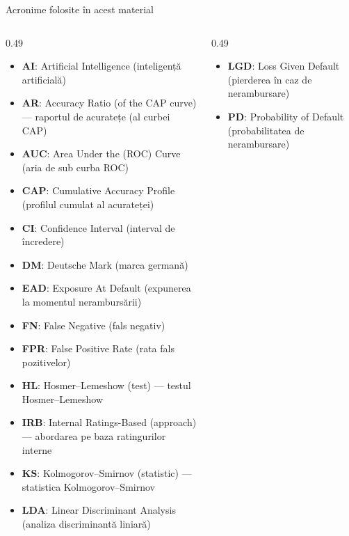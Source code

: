 {
\begin{frame}[noframenumbering]
    \titlepage
\end{frame}
}
\begin{frame}{Acronime folosite în acest material}
\begin{columns}[T]
\begin{column}{0.49\textwidth}
\begin{itemize}\setlength{\itemsep}{0pt}
    \item \textbf{AI}: Artificial Intelligence (inteligență artificială)
    \item \textbf{AR}: Accuracy Ratio (of the CAP curve) — raportul de acuratețe (al curbei CAP)
    \item \textbf{AUC}: Area Under the (ROC) Curve (aria de sub curba ROC)
    \item \textbf{CAP}: Cumulative Accuracy Profile (profilul cumulat al acurateței)
    \item \textbf{CI}: Confidence Interval (interval de încredere)
    \item \textbf{DM}: Deutsche Mark (marca germană)
    \item \textbf{EAD}: Exposure At Default (expunerea la momentul nerambursării)
    \item \textbf{FN}: False Negative (fals negativ)
    \item \textbf{FPR}: False Positive Rate (rata fals pozitivelor)
    \item \textbf{HL}: Hosmer–Lemeshow (test) — testul Hosmer–Lemeshow
    \item \textbf{IRB}: Internal Ratings-Based (approach) — abordarea pe baza ratingurilor interne
    \item \textbf{KS}: Kolmogorov–Smirnov (statistic) — statistica Kolmogorov–Smirnov
    \item \textbf{LDA}: Linear Discriminant Analysis (analiza discriminantă liniară)
\end{itemize}
\end{column}
\begin{column}{0.49\textwidth}
\begin{itemize}\setlength{\itemsep}{0pt}
    \item \textbf{LGD}: Loss Given Default (pierderea în caz de nerambursare)
    \item \textbf{PD}: Probability of Default (probabilitatea de nerambursare)

\end{itemize}
\end{column}
\end{columns}
\end{frame}
